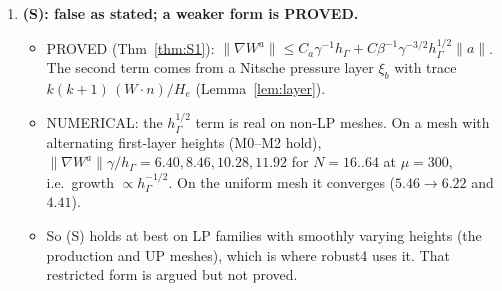\documentclass[11pt]{article}
\theoremstyle{remark}
\newcommand{\hG}{h_\Gamma}
\begin{document}
\begin{enumerate}
 $v\mapsto v(z)\cdot n$ be uniformly visible to $V^\sharp$ on near-periodic stars. The following are PROVED:
 \begin{itemize}
 \item on exactly periodic stars, the only $\operatorname{Ker}_T/K_T$-sensitive functional is $\beta_k(b_L+b_R)\,v(z)\cdot n$;
 \item on tilted stars, per-edge (M),(D) force $v(z)=0$. So any certificate must use the combined (D), whose rank drops exactly on the flat locus. This is why plain compactness cannot work.
 \end{itemize}
 NUMERICAL: (V) holds with visibility $\ge0.16$ on 100 periodic and near-periodic stars. Its limit depends on the direction of
 approach (blow-up), so it is bounded but not continuous.
\item \textbf{(S): false as stated; a weaker form is PROVED.}
 \begin{itemize}
 \item PROVED (Thm~\ref{thm:S1}): $\|\nabla W^a\|\le C_a\gamma^{-1}\hG+C\beta^{-1}\gamma^{-3/2}\hG^{1/2}\|a\|$. The second term comes from a
 Nitsche pressure layer $\xi_b$ with trace $k(k+1)\,(W\cdot n)/H_e$ (Lemma~\ref{lem:layer}).
 \item NUMERICAL: the $\hG^{1/2}$ term is real on non-LP meshes. On a mesh with alternating first-layer heights (M0--M2 hold),
 $\|\nabla W^a\|\gamma/\hG=6.40,8.46,10.28,11.92$ for $N=16..64$ at $\mu=300$, i.e.\ growth $\propto\hG^{-1/2}$. On the uniform mesh it converges
 ($5.46\to6.22$ and $4.41$).
 \item So (S) holds at best on LP families with smoothly varying heights (the production and \textsf{UP} meshes), which is where
 robust4 uses it. That restricted form is argued but not proved.
 \end{itemize}
\end{enumerate}
\end{document}
